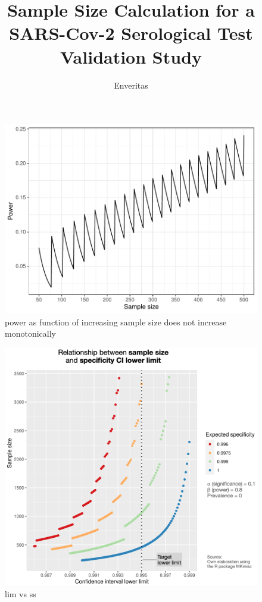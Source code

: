 \documentclass{article}
\title{Sample Size Calculation for a SARS-Cov-2 Serological Test Validation Study}
\author{Enveritas}
\begin{document}
\nocite{*}
\maketitle


\begin{figure}
  \centering
  \includegraphics[width=\linewidth]{img/power_saw.pdf}
  \caption{power as function of increasing sample size does not increase monotonically }
  \label{fig:power_saw}
\end{figure}


\begin{figure}
  \centering
  \includegraphics[width=\linewidth]{img/editedByHand_sample_size_sp_lim.png}
  \caption{lim vs ss}
  \label{fig:lim_vs_ss}
\end{figure}
\end{document}
